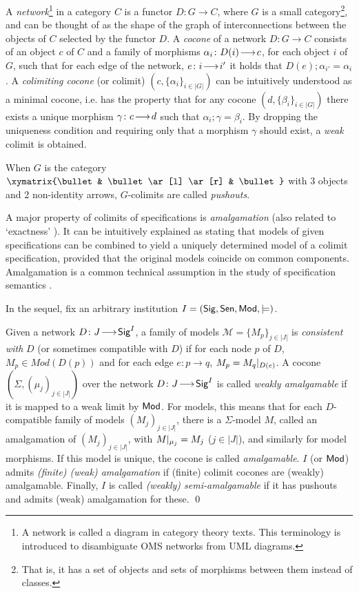 \documentclass[10pt,fleqn,final]{scrreprt}
\newcommand{\cbs}[0]{\color{red}\xspace} %
\newcommand{\cbe}[0]{\color{black}\xspace} %
\newcommand{\Sig}{\mathsf{Sig}}
\newenvironment{definitions}[0]{\medskip }{}
\begin{document}
\begin{definitions}
A \emph{network}\footnote{A network is called a diagram in category theory texts.\cbs This terminology is introduced to disambiguate OMS networks\cbe
from UML diagrams.} in a category $C$ is 
a functor $D:G\to C$, where $G$ is a small category\footnote{That is, it has a set of objects and sets of morphisms between them
instead of classes.}, and can be thought of as the shape of the graph of
interconnections between the objects of $C$ selected by the functor $D$. A \emph{cocone} of
a network $D:G\to C$ consists of an object $c$ of $C$ and a family of
morphisms $\alpha_i\colon D(i)\!\longrightarrow\!c$, for each object $i$ of $G$, such that for
each edge of the network, $e\colon i\!\longrightarrow\!i'$ \cbs it holds\cbe{} that 
$D(e);\alpha_{i'} = \alpha_{i}$. 
A \emph{colimiting cocone} (or colimit) $(c, \{\alpha_i\}_{i\in|G|})$ can be
intuitively understood as a minimal cocone, i.e. has the property that for any 
cocone $(d, \{\beta_i\}_{i\in |G|})$ there exists a unique morphism 
$\gamma\colon c\!\longrightarrow\!d$ such that $\alpha_i;\gamma = \beta_i$. By dropping the 
uniqueness condition and requiring only that a morphism $\gamma$ should exist,\cbs
 a \emph{weak} colimit is obtained.\cbe 

When $G$ is the category $\xymatrix{\bullet & \bullet \ar[l] \ar[r]
& \bullet }$ with 3 objects and 2 non-identity arrows, $G$-colimits are
called  \emph{pushouts}.  

A major property of colimits of specifications is \emph{amalgamation} (also related to `exactness' \cite{DGS91}). It can be intuitively explained as 
stating that models of given
specifications can be combined to yield a uniquely determined model of
a colimit specification, provided that the original models coincide on
common components. Amalgamation is a common technical assumption in the 
study of specification semantics
\cite{STbook}.

In the sequel, fix an arbitrary institution
$I=(\Sig,\Sen,\Mod,\models)$.  

\begin{definition}
Given a network $D\map{J}{\Sig^I}$, 
a family of models $\mathcal{M} = \{M_p\}_{j\in |J|}$ is
\emph{consistent with} $D$ (or sometimes compatible with $D$) 
if for each node $p$ of $D$, $M_p \in Mod(D(p))$ and
for each edge $e:p\rightarrow q$, $M_p = M_q|_{D(e)}$.
  A cocone
$(\Sigma,(\mu_j)_{j\in|J|})$ over the network $D\map{J}{\Sig^I}$ is
called \emph{weakly amalgamable} if it is mapped to a weak limit by $\mathsf{Mod}$.
For models, this means that for each $D$-compatible family of
models $(M_j)_{j\in|J|}$, there is a $\Sigma$-model $M$, called an amalgamation of 
 $(M_j)_{j\in|J|}$,
with
$M|_{\mu_j}=M_j$ ($j\in|J|$), and similarly for model morphisms.
 If this model is unique, the cocone
is called \emph{amalgamable}. 
$I$ (or $\mathsf{Mod}$) admits \emph{(finite) (weak)
amalgamation} if (finite) colimit cocones are (weakly) amalgamable.
Finally, $I$ is called \emph{(weakly) semi-amalgamable} if 
it has pushouts and admits (weak) amalgamation for these.
\qed\end{definition}


\end{definitions}
\end{document}
